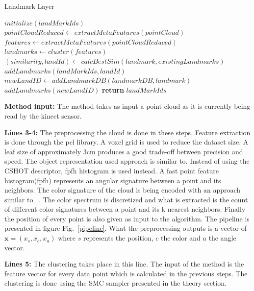 \documentclass[]{article}
\begin{document}
\begin{algorithm}
    \caption{Landmark Layer}\label{euclid}
    \begin{algorithmic}[1]
        \State $initialize(landMarkIds)$
        \State $pointCloudReduced \gets extractMetaFeatures(pointCloud)$ 
        \State $features \gets extractMetaFeatures(pointCloudReduced)$
        \State $landmarks \gets cluster(features)$  
        \State $ (similarity, landId) \gets calcBestSim(landmark, existingLandmarks) $
        \State $ addLandmarks(landMarkIds, landId)$
        \Else 
        \State $ newLandID \gets addLandmarkDB(landmarkDB, landmark)$
        \State $addLandmarks(newLandID)$
        \EndIf
        \EndFor
        \State \textbf{return} $ landMarkIds$
        \EndProcedure
    \end{algorithmic}
\end{algorithm}


\textbf{Method input:} The method takes as input a point cloud as it is currently being read by the kinect sensor.

\textbf{Lines 3-4:} The preprocessing the cloud is done in these steps. Feature extraction is done through the pcl\cite{pcl} library. A voxel grid is used to reduce the dataset size. A leaf size of approximately 3cm produces a good trade-off between precision and speed. The object representation used approach is similar to\cite{objectpointslam}. Instead of using the CSHOT descriptor, fpfh\cite{fpfh} histogram is used instead. A fast point feature histogram(fpfh) represents an angular signature between a point and its neighbors. The color signature of the cloud is being encoded with an approach similar to ~\cite{smcddp}. The color spectrum is discretized and what is extracted is the count of different color signatures between a point and its k nearest neighbors. Finally the position of every point is also given as input to the algorithm. The pipeline is presented in figure Fig.~\ref{pipeline}. What the preprocessing outputs is a vector of $\textbf{x} =(x_s, x_c, x_a)$ where $s$ represents the position, $c$ the color and $a$ the angle vector.

\textbf{Lines 5:} The clustering takes place in this line. The input of the method is the feature vector for every data point which is calculated in the previous steps. The clustering is done using the SMC sampler presented in the theory section. 
\end{document}

